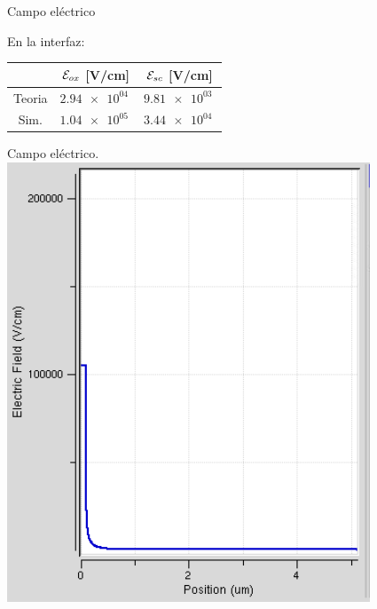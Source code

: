 \documentclass{/home/daniel/GitHub/USC-Physics-Degree-Notes/Notes/Presentacion}
\begin{document}
\begin{frame}{Campo eléctrico}
    \begin{minipage}{0.4\linewidth}
        \begin{center}
            \small
            En la interfaz: 
            \vspace*{1em}

            \begin{tabular}{ccc}
                \toprule
                & $\mathcal{E}_{ox} $ [V/cm] & $\mathcal{E}_{sc} $ [V/cm]   \\ \midrule
                Teoria & $ \SI{2.94e+04}{}$ & $\SI{9.81e+03}{}$ \\
                Sim. &  $\SI{1.04e+05}{}$ &  $\SI{3.44e+04}{}$  \\
                \bottomrule
            \end{tabular}
        \end{center}
    \end{minipage}
    \hfill
    \begin{minipage}{0.55\linewidth} 
        \centering
        Campo eléctrico.
        \vspace*{1em}
        \includegraphics[width=0.7\linewidth]{../Imagenes/2-Field.png}
    \end{minipage}
\end{frame}

\end{document}
